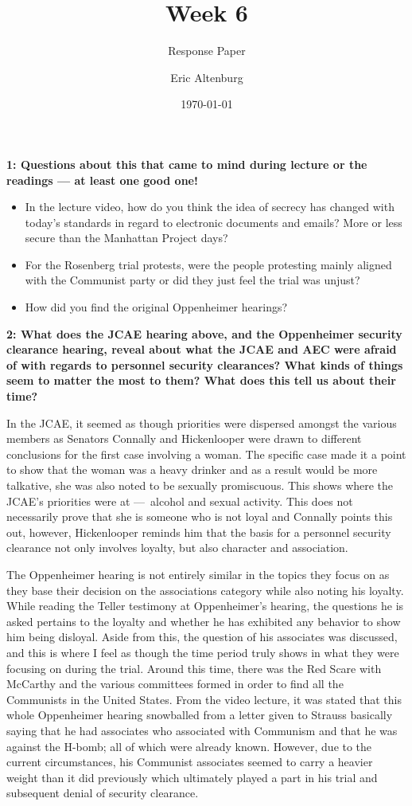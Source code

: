 \documentclass[12pt]{turabian-researchpaper}
\title{Week 6}
\subtitle{Response Paper}
\author{Eric Altenburg}
\date{\today}
\newcommand\question[2]{\noindent\textbf{#1: #2}}
\begin{document}
	\maketitle

	\question{1}{Questions about this that came to mind during lecture or the readings — at least one good one!}

		\begin{itemize}
			\item In the lecture video, how do you think the idea of secrecy has changed with today's standards in regard to electronic documents and emails? More or less secure than the Manhattan Project days?
			\item For the Rosenberg trial protests, were the people protesting mainly aligned with the Communist party or did they just feel the trial was unjust?
			\item How did you find the original Oppenheimer hearings?
		\end{itemize}

	\question{2}{What does the JCAE hearing above, and the Oppenheimer security clearance hearing, reveal about what the JCAE and AEC were afraid of with regards to personnel security clearances? What kinds of things seem to matter the most to them? What does this tell us about their time?}

		In the JCAE, it seemed as though priorities were dispersed amongst the various members as Senators Connally and Hickenlooper were drawn to different conclusions for the first case involving a woman. The specific case made it a point to show that the woman was a heavy drinker and as a result would be more talkative, she was also noted to be sexually promiscuous. This shows where the JCAE's priorities were at — alcohol and sexual activity. This does not necessarily prove that she is someone who is not loyal and Connally points this out, however, Hickenlooper reminds him that the basis for a personnel security clearance not only involves loyalty, but also character and association.

		The Oppenheimer hearing is not entirely similar in the topics they focus on as they base their decision on the associations category while also noting his loyalty. While reading the Teller testimony at Oppenheimer's hearing, the questions he is asked pertains to the loyalty and whether he has exhibited any behavior to show him being disloyal. Aside from this, the question of his associates was discussed, and this is where I feel as though the time period truly shows in what they were focusing on during the trial. Around this time, there was the Red Scare with McCarthy and the various committees formed in order to find all the Communists in the United States. From the video lecture, it was stated that this whole Oppenheimer hearing snowballed from a letter given to Strauss basically saying that he had associates who associated with Communism and that he was against the H-bomb; all of which were already known. However, due to the current circumstances, his Communist associates seemed to carry a heavier weight than it did previously which ultimately played a part in his trial and subsequent denial of security clearance.
\end{document}

